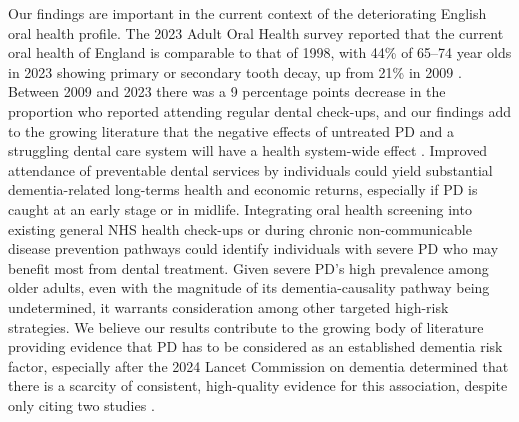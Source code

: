 \documentclass[11pt,a4paper]{article}
\begin{document}
Our findings are important in the current context of the deteriorating English oral health profile. The 2023 Adult Oral Health survey reported that the current oral health of England is comparable to that of 1998, with 44\% of 65--74 year olds in 2023 showing primary or secondary tooth decay, up from 21\% in 2009 \cite{ref41}. Between 2009 and 2023 there was a 9 percentage points decrease in the proportion who reported attending regular dental check-ups, and our findings add to the growing literature that the negative effects of untreated PD and a struggling dental care system will have a health system-wide effect \cite{ref42}. Improved attendance of preventable dental services by individuals could yield substantial dementia-related long-terms health and economic returns, especially if PD is caught at an early stage or in midlife. Integrating oral health screening into existing general NHS health check-ups or during chronic non-communicable disease prevention pathways could identify individuals with severe PD who may benefit most from dental treatment. Given severe PD's high prevalence among older adults, even with the magnitude of its dementia-causality pathway being undetermined, it warrants consideration among other targeted high-risk strategies. We believe our results contribute to the growing body of literature providing evidence that PD has to be considered as an established dementia risk factor, especially after the 2024 Lancet Commission on dementia determined that there is a scarcity of consistent, high-quality evidence for this association, despite only citing two studies \cite{ref18,ref43}.
\end{document}
